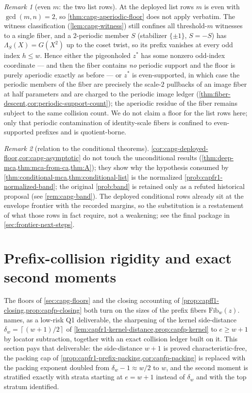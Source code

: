 \documentclass[11pt]{article}
\theoremstyle{definition}
\theoremstyle{remark}
\newtheorem{remark}[remark]{Remark}
\providecommand{\ceil}[1]{\left\lceil #1\right\rceil}
\begin{document}
\begin{remark}[even $m$: the two list rows]\label{rem:capg-evenm}
At the deployed list rows $m$ is even with $\gcd(m,n)=2$, so
\cref{thm:capg-aperiodic-floor} does not apply verbatim.  The witness
classification (\cref{lem:capg-witness}) still confines all threshold-$m$
witnesses to a single fiber, and a $2$-periodic member $S$ (stabilizer
$\{\pm1\}$, $S=-S$) has $\Lambda_S(X)=G(X^{2})$ up to the coset twist, so
its prefix vanishes at every odd index $h\leq w$.  Hence either the
pigeonholed $z^{*}$ has some nonzero odd-index coordinate --- and then the
fiber contains \emph{no} periodic support and the floor is purely
aperiodic exactly as before --- or $z^{*}$ is even-supported, in which case
the periodic members of the fiber are precisely the scale-$2$ pullbacks of
an image fiber at half parameters and are charged to the periodic image
ledger (\cref{thm:fiber-descent,cor:periodic-support-count}); the aperiodic
residue of the fiber remains subject to the same collision count.  We do not
claim a floor for the list rows here; only that periodic contamination of
identity-scale fibers is confined to even-supported prefixes and is
quotient-borne.
\end{remark}

\begin{remark}[relation to the conditional theorems]
\cref{cor:capg-deployed-floor,cor:capg-asymptotic} do not touch the
unconditional results (\cref{thm:deep-mca,thm:mca-from-ca,thm:A}); they
show why the hypothesis consumed by
\cref{thm:conditional-mca,thm:conditional-list} is the normalized
\cref{prob:capfr1-normalized-band}; the original \cref{prob:band} is retained
only as a refuted historical proposal (see \cref{rem:capg-band}).
The deployed conditional rows already sit at the envelope frontier with the
recorded margins, so the substitution is a restatement of what those rows
in fact require, not a weakening; see the final package in
\cref{sec:frontier-next-steps}.
\end{remark}

\section{Prefix-collision rigidity and exact second moments}
\label{sec:capg-ledger}

The floors of \cref{sec:capg-floors} and the closing accounting of
\cref{prop:capff1-closing,prop:capfp-closing} both turn on the sizes of the
prefix fibers $\mathrm{Fib}_w(z)$.   names,
as a low-risk \textup{Q1} deliverable, the sharpening of the kernel
side-distance $\delta_w=\ceil{(w+1)/2}$ of
\cref{lem:capfr1-kernel-distance,prop:capfp-kernel} to $e\ge w+1$ by
locator subtraction, together with an exact collision ledger built on it.
This section pays that deliverable: the side-distance $w+1$ is proved
characteristic-free, the packing cap of
\cref{prop:capfr1-prefix-packing,cor:capfp-packing} is replaced with the
packing exponent doubled from $\delta_w-1\approx w/2$ to $w$, and the
second moment is stratified exactly with strata starting at $e=w+1$
instead of $\delta_w$ and with the top stratum identified.
\end{document}
